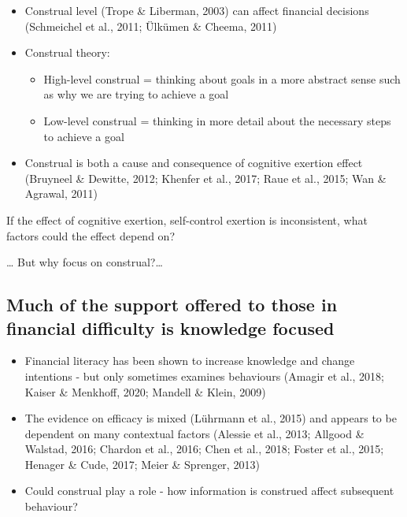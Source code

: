 \documentclass[
  letterpaper,
  DIV=11,
  numbers=noendperiod]{scrartcl}
\providecommand{\tightlist}{%
  \setlength{\itemsep}{0pt}\setlength{\parskip}{0pt}}\usepackage{longtable,booktabs,array}
\begin{document}
\begin{itemize}
\item
  Construal level (Trope \& Liberman, 2003) can affect financial
  decisions (Schmeichel et al., 2011; Ülkümen \& Cheema, 2011)
\item
  Construal theory:

  \begin{itemize}
  \tightlist
  \item
    High-level construal = thinking about goals in a more abstract sense
    such as why we are trying to achieve a goal
  \item
    Low-level construal = thinking in more detail about the necessary
    steps to achieve a goal
  \end{itemize}
\item
  Construal is both a cause and consequence of cognitive exertion effect
  (Bruyneel \& Dewitte, 2012; Khenfer et al., 2017; Raue et al., 2015;
  Wan \& Agrawal, 2011)
\end{itemize}

If the effect of cognitive exertion, self-control exertion is
inconsistent, what factors could the effect depend on?

\ldots{} But why focus on construal?\ldots{}

\hypertarget{much-of-the-support-offered-to-those-in-financial-difficulty-is-knowledge-focused}{%
\subsection{Much of the support offered to those in financial difficulty
is knowledge
focused}\label{much-of-the-support-offered-to-those-in-financial-difficulty-is-knowledge-focused}}

\begin{itemize}
\item
  Financial literacy has been shown to increase knowledge and change
  intentions - but only sometimes examines behaviours (Amagir et al.,
  2018; Kaiser \& Menkhoff, 2020; Mandell \& Klein, 2009)
\item
  The evidence on efficacy is mixed (Lührmann et al., 2015) and appears
  to be dependent on many contextual factors (Alessie et al., 2013;
  Allgood \& Walstad, 2016; Chardon et al., 2016; Chen et al., 2018;
  Foster et al., 2015; Henager \& Cude, 2017; Meier \& Sprenger, 2013)
\item
  Could construal play a role - how information is construed affect
  subsequent behaviour?
\end{itemize}
\end{document}
